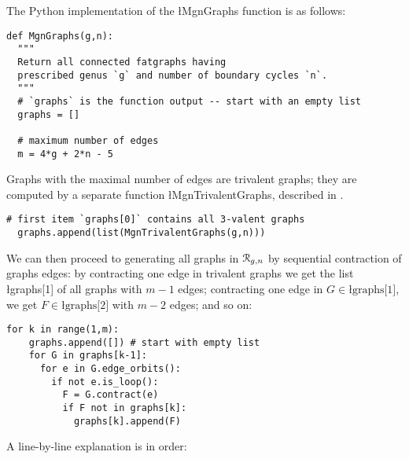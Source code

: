 The Python implementation of the \l{MgnGraphs} function is as follows:
\begin{lstlisting}[name=MgnGraphs,firstnumber=1]
def MgnGraphs(g,n):
  """
  Return all connected fatgraphs having
  prescribed genus `g` and number of boundary cycles `n`.
  """
  # `graphs` is the function output -- start with an empty list
  graphs = []

  # maximum number of edges
  m = 4*g + 2*n - 5
\end{lstlisting}
Graphs with the maximal number of edges are trivalent graphs; they are
computed by a separate function \l{MgnTrivalentGraphs}, described in
.
\begin{lstlisting}[name=MgnGraphs,firstnumber=11]
  # first item `graphs[0]` contains all 3-valent graphs
  graphs.append(list(MgnTrivalentGraphs(g,n)))
\end{lstlisting}
We can then proceed to generating all graphs in $\mathcal{R}_{g,n}$ by
sequential contraction of graphs edges: by contracting one edge in
trivalent graphs we get the list \l{graphs[1]} of all graphs with
$m-1$ edges; contracting one edge in $G \in \text{\l{graphs[1]}}$, we
get $F \in \text{\l{graphs[2]}}$ with $m-2$ edges; and so on:
\begin{lstlisting}[name=MgnGraphs,firstnumber=13]
  for k in range(1,m):
    graphs.append([]) # start with empty list
    for G in graphs[k-1]:
      for e in G.edge_orbits():
        if not e.is_loop():
          F = G.contract(e)
          if F not in graphs[k]:
            graphs[k].append(F)
\end{lstlisting}
A line-by-line explanation is in order:
